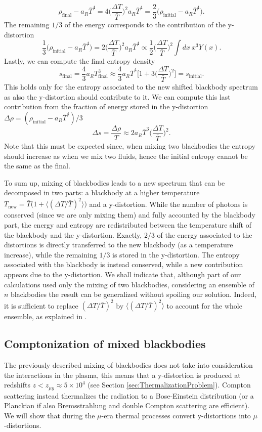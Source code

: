 $$\rho_\text{final}-a_R \bar T^4=4\bigg(\frac{\Delta T}{\bar T}\bigg)^2a_R\bar T^4=\frac{2}{3}\bigg(\rho_\text{initial}-a_R \bar T^4\bigg).$$
The remaining $1/3$ of the energy corresponds to the contribution of the y-distortion
$$\frac{1}{3}\bigg(\rho_\text{initial}-a_R \bar T^4\bigg)=2\bigg(\frac{\Delta T}{\bar T}\bigg)^2a_R\bar T^4\propto\frac{1}{2}\bigg(\frac{\Delta T}{\bar T}\bigg)^2\int dx\ x^3 Y(x).$$
Lastly, we can compute the final entropy density$$ s_\text{final}=\frac{4}{3}a_RT_\text{final}^3\approx\frac{4}{3}a_R \bar T^4\bigg[1+3\bigg(\frac{\Delta T}{\bar T}\bigg)^2\bigg]=s_\text{initial}.$$ This holds only for the entropy associated to the new shifted blackbody spectrum as also the y-distortion should contribute to it. We can compute this last contribution from the fraction of energy stored in the y-distortion $\Delta \rho = (\rho_\text{initial}-a_R \bar T^4)/3$
$$\Delta s=\frac{\Delta \rho}{T}\approx 2a_R \bar T^3\bigg(\frac{\Delta T}{\bar T}\bigg)^2.$$
Note that this must be expected since, when mixing two blackbodies the entropy should increase as when we mix two fluids, hence the initial entropy cannot be the same as the final.

To sum up, mixing of blackbodies leads to a new spectrum that can be decomposed in two parts: a blackbody at a higher temperature $T_\text{new}=\bar T\big(1+\langle(\Delta T/\bar T)^2\rangle\big)$ and a y-distortion. While the number of photons is conserved (since we are only mixing them) and fully accounted by the blackbody part, the energy and entropy are redistributed between the temperature shift of the blackbody and the y-distortion. Exactly, $2/3$ of the energy associated to the distortions is directly transferred to the new blackbody (as a temperature increase), while the remaining $1/3$ is stored in the y-distortion. The entropy associated with the blackbody is instead conserved, while a new contribution appears due to the y-distortion. We shall indicate that, although part of our calculations used only the mixing of two blackbodies, considering an ensemble of $n$ blackbodies the result can be generalized without spoiling our solution. Indeed, it is sufficient to replace $(\Delta T/\bar T)^2$ by $\langle(\Delta T/\bar T)^2\rangle$ to account for the whole ensemble, as explained in \cite{MixingBB}.
\subsection{Comptonization of mixed blackbodies}
\label{sec:MixSD_Comportonization}
The previously described mixing of blackbodies does not take into consideration the interactions in the plasma, this means that a y-distortion is produced at redshifts $z<z_{\mu y}\approx 5\times 10^4$ (see Section \ref{sec:ThermalizationProblem}). Compton scattering instead thermalizes the radiation to a Bose-Einstein distribution (or a Planckian if also Bremsstrahlung and double Compton scattering are efficient). We will show that during the $\mu$-era thermal processes convert y-distortions into $\mu$-distortions. 

